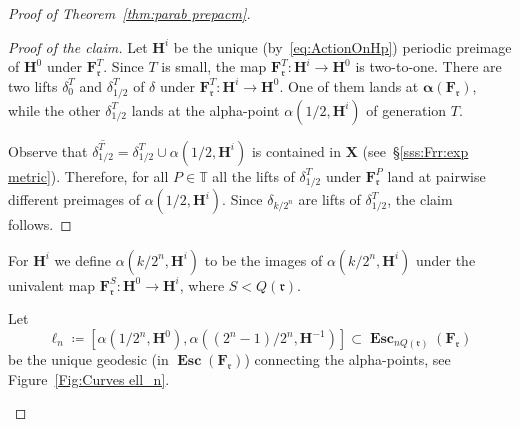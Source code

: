 \documentclass{amsart}
\newcommand{\1}{{\mathbb 1 }}
\newcommand\PT{\mathbb{ T}}
\newcommand{\bF}{{\mathbf F}}
\newcommand{\bX}{{\mathbf X}}
\newcommand{\bH}{{\mathbf H}}
\newcommand{\rr}{\mathfrak{r}}
\theoremstyle{remark}
\numberwithin{equation}{section}
\theoremstyle{definition}
\newcommand{\Esc}{{\boldsymbol{\operatorname{Esc}}}}
\newcommand{\balpha}{{\boldsymbol \alpha}}
\theoremstyle{nonumberbreak}
\begin{document}
\begin{proof}[Proof of Theorem~\ref{thm:parab prepacm}]
\begin{proof}[Proof of the claim]
 
 
 Let $\bH^i$ be the unique (by~\eqref{eq:ActionOnHp}) periodic preimage of $\bH^0$ under $\bF^T_\rr$. Since $T$ is small, the map $\bF_\rr^T\colon \bH^i\to \bH^0$ is two-to-one. There are two lifts $\delta^T_0$ and $\delta^T_{1/2}$ of $\delta$ under $\bF_\rr^T\colon \bH^i\to \bH^0$. One of them lands at $\balpha(\bF_\rr)$, while the other $\delta^T_{1/2}$ 
  lands at the alpha-point $\alpha(1/2, \bH^i)$ of generation $T$.
  
   Observe that $\overline {\delta^T_{1/2}}=\delta^T_{1/2}\cup \alpha(1/2, \bH^i)$ is contained in $\bX$ (see~\S\ref{sss:Frr:exp metric}). Therefore, for all $P\in  \PT$ all the lifts of $\delta^T_{1/2}$ under $\bF_\rr^P$ land at pairwise different preimages of $ \alpha(1/2, \bH^i)$. Since $\delta_{k/2^n}$ are lifts of $\delta^T_{1/2}$, the claim follows.
\end{proof}

For $\bH^i$ we define $\alpha(k/2^n, \bH^i)$ to be the images of $\alpha(k/2^n, \bH^i)$ under the univalent map $\bF_\rr^S\colon \bH^0\to \bH^i$, where $S<Q(\rr)$.

Let \[\ell_n \coloneqq [\alpha(1/2^n, \bH^0),\alpha((2^n-1)/2^n, \bH^{-1})]\subset \Esc_{n Q(\rr)}(\bF_\rr)\] 
be the unique geodesic (in $\Esc(\bF_\rr)$) connecting the alpha-points, see Figure~\ref{Fig:Curves ell_n}.





\begin{figure} 
\end{figure}
\end{proof}
\end{document}
